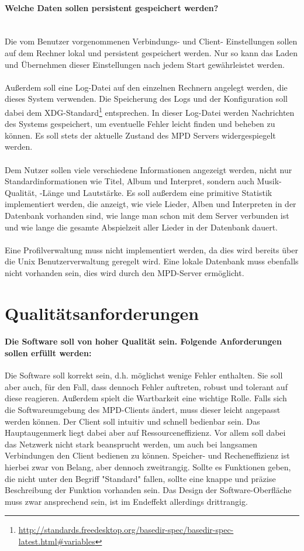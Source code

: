 \paragraph{Welche Daten sollen persistent gespeichert werden?}\ \\ 
Die vom Benutzer vorgenommenen Verbindungs- und Client- Einstellungen sollen auf dem Rechner lokal und persistent gespeichert werden. Nur so kann
das Laden und Übernehmen dieser Einstellungen nach jedem Start gewährleistet werden. 
\\ \\
Außerdem soll eine Log-Datei auf den einzelnen Rechnern angelegt werden, die dieses System
verwenden. Die Speicherung des Logs und der Konfiguration soll dabei dem XDG-Standard\footnote{\url{http://standards.freedesktop.org/basedir-spec/basedir-spec-latest.html\#variables}} entsprechen. 
In dieser Log-Datei werden Nachrichten des Systems gespeichert, um eventuelle Fehler
leicht finden und beheben zu können. Es soll stets der aktuelle Zustand des MPD Servers widergespiegelt werden.
\\ \\
Dem Nutzer sollen viele verschiedene Informationen angezeigt werden, nicht nur Standardinformationen
wie Titel, Album und Interpret, sondern auch Musik-Qualität, -Länge und Lautstärke.
Es soll außerdem eine primitive Statistik implementiert werden, die anzeigt, wie viele Lieder, Alben und
Interpreten in der Datenbank vorhanden sind, wie lange man schon mit dem Server verbunden ist und wie 
lange die gesamte Abspielzeit aller Lieder in der Datenbank dauert.\ 
\\ \\
Eine Profilverwaltung muss nicht implementiert werden, da dies wird bereits über die Unix Benutzerverwaltung geregelt wird.
Eine lokale Datenbank muss ebenfalls nicht vorhanden sein, dies wird durch den MPD-Server ermöglicht.

\section{Qualitätsanforderungen}
\paragraph{Die Software soll von hoher Qualität sein. Folgende Anforderungen sollen erfüllt werden:} 
Die Software soll korrekt sein, d.h. möglichst wenige Fehler enthalten.
Sie soll aber auch, für den Fall, dass dennoch Fehler auftreten, robust
und tolerant auf diese reagieren. Außerdem spielt die Wartbarkeit 
eine wichtige Rolle. Falls sich die Softwareumgebung des MPD-Clients
ändert, muss dieser leicht angepasst werden können.
Der Client soll intuitiv und schnell bedienbar sein.
Das Hauptaugenmerk liegt dabei aber auf Ressourceneffizienz. Vor allem soll dabei 
das Netzwerk nicht stark beansprucht werden, um auch bei langsamen Verbindungen den Client
bedienen zu können. Speicher- und Recheneffizienz ist hierbei zwar von Belang, aber dennoch zweitrangig. 
Sollte es Funktionen geben, die nicht unter den Begriff "Standard" fallen, sollte eine knappe
und präzise Beschreibung der Funktion vorhanden sein.
Das Design der Software-Oberfläche muss zwar ansprechend sein, ist im Endeffekt allerdings drittrangig.

